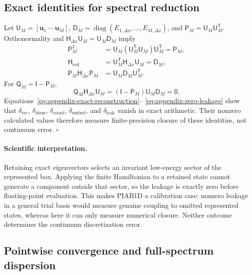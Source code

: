 \documentclass[11pt]{article}
\newcommand{\mat}[1]{\mathsf{#1}}
\newcommand{\vect}[1]{\boldsymbol{#1}}
\begin{document}
\subsection{Exact identities for spectral reduction}

Let $\mat{U}_M=[\vect{u}_1\ \cdots\ \vect{u}_M]$,
$\mat{D}_M=\operatorname{diag}(E_{1,\Delta x},\ldots,E_{M,\Delta x})$, and
$\mat{P}_M=\mat{U}_M\mat{U}_M^{\mathsf T}$. Orthonormality and
$\mat{H}_{\Delta x}\mat{U}_M=\mat{U}_M\mat{D}_M$ imply
\begin{align}
 \mat{P}_M^2
 &=\mat{U}_M(\mat{U}_M^{\mathsf T}\mat{U}_M)\mat{U}_M^{\mathsf T}
 =\mat{P}_M, \\
 \mat{H}_{\mathrm{red}}
 &=\mat{U}_M^{\mathsf T}\mat{H}_{\Delta x}\mat{U}_M
 =\mat{D}_M, \\
 \mat{P}_M\mat{H}_{\Delta x}\mat{P}_M
 &=\mat{U}_M\mat{D}_M\mat{U}_M^{\mathsf T}.
 \label{eq:appendix-reduction-identities}
\end{align}
For $\mat{Q}_M=\mat{I}-\mat{P}_M$,
\begin{equation}
 \mat{Q}_M\mat{H}_{\Delta x}\mat{U}_M
 =(\mat{I}-\mat{P}_M)\mat{U}_M\mat{D}_M
 =\mat{0}.
 \label{eq:appendix-zero-leakage}
\end{equation}
Equations~\eqref{eq:appendix-exact-reconstruction}--
\eqref{eq:appendix-zero-leakage} show that
$\delta_{\mathrm{rec}}$, $\delta_{\mathrm{idem}}$,
$\delta_{\mathrm{coord}}$, $\delta_{\mathrm{embed}}$, and
$\delta_{\mathrm{leak}}$ vanish in exact arithmetic. Their nonzero calculated values
therefore measure finite-precision closure of these identities, not continuum error.
\hfill$\square$

\paragraph{Scientific interpretation.}
Retaining exact eigenvectors selects an invariant low-energy sector of the represented
box. Applying the finite Hamiltonian to a retained state cannot generate a component
outside that sector, so the leakage is exactly zero before floating-point evaluation.
This makes PIAB1D a calibration case: nonzero leakage in a general trial basis would
measure genuine coupling to omitted represented states, whereas here it can only
measure numerical closure. Neither outcome determines the continuum discretization
error.

\subsection{Pointwise convergence and full-spectrum dispersion}
\end{document}
